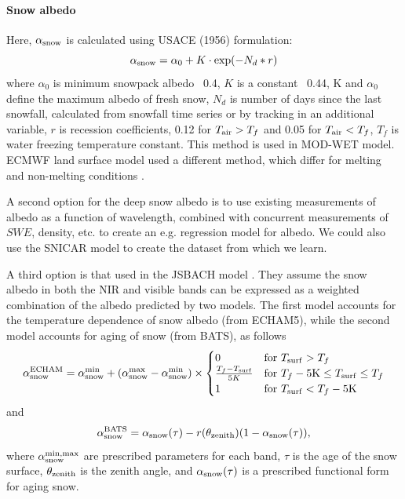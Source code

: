 \documentclass[twoside,10pt]{report}
\begin{document}
\paragraph{Snow albedo}

Here, $\alpha_{\rm snow}$ is calculated using USACE (1956) formulation:
\begin{equation}
\alpha_{\rm snow} = \alpha_0+K \cdot \exp(-N_d * r)    
\end{equation}
where $\alpha_0$ is minimum snowpack albedo ~0.4, $K$ is a constant ~0.44, K and $\alpha_0$ define the maximum albedo of fresh snow, $N_d$ is number of days since the last snowfall, calculated from snowfall time series or by tracking in an additional variable, $r$ is recession coefficients, 0.12 for $T_{\rm air}>T_f$ and 0.05 for $T_{\rm air}<T_f$, $T_f$ is water freezing temperature constant. This method is used in MOD-WET model. ECMWF land surface model used a different method, which differ for melting and non-melting conditions \citep{Dutra_Balsamo_2010}.

A second option for the deep snow albedo is to use existing measurements of albedo as a function of wavelength, combined with concurrent measurements of $SWE$, density, etc. to create an e.g. regression model for albedo. We could also use the SNICAR model to create the dataset from which we learn. 

A third option is that used in the JSBACH model \citep{JSBACH}. They assume the snow albedo in both the NIR and visible bands can be expressed as a weighted combination of the albedo predicted by two models. The first model accounts for the temperature dependence of snow albedo (from ECHAM5), while the second model accounts for aging of snow (from BATS), as follows
\begin{equation}
    \alpha_{\rm snow}^{\rm ECHAM} = \alpha_{\rm snow}^{\rm min}+ (\alpha_{\rm snow}^{\rm max}-\alpha_{\rm snow}^{\rm min})\times \begin{cases}
        0 & \text{for  } T_{\rm surf} > T_f \\
        \frac{T_f-T_{\rm surf}}{5 K} &\text{for  } T_f - 5\text{K} \leq T_{\rm surf} \leq T_f \\
        1 & \text{for  } T_{\rm surf} < T_f-5 \text{K} \\
    \end{cases}
\end{equation}
and
\begin{equation}
    \alpha_{\rm snow}^{\rm BATS} = \alpha_{\rm snow}(\tau) - r(\theta_{\rm zenith})(1-\alpha_{\rm snow}(\tau)),
\end{equation}
where $\alpha_{\rm snow}^{\rm min, max}$ are prescribed parameters for each band, $\tau$ is the age of the snow surface, $\theta_{\rm zenith}$ is the zenith angle, and $\alpha_{\rm snow}(\tau)$ is a prescribed functional form for aging snow.
\end{document}
